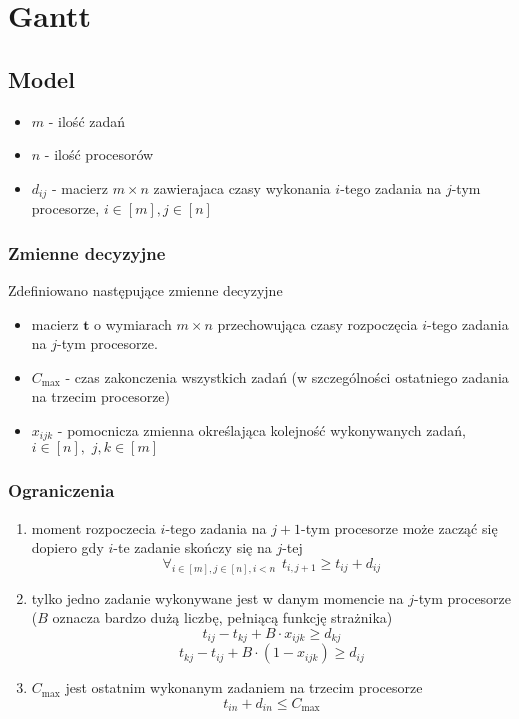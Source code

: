 \section{Gantt}

\subsection{Model}
\begin{itemize}
    \item $m$ - ilość zadań
    \item $n$ - ilość procesorów
    \item $d_{ij}$ - macierz $m\times n$ zawierajaca czasy wykonania $i$-tego zadania na $j$-tym procesorze, $i\in[m], j\in[n]$
\end{itemize}

\subsubsection{Zmienne decyzyjne}
Zdefiniowano następujące zmienne decyzyjne
\begin{itemize}
    \item macierz $\mathbf{t}$ o wymiarach $m \times n$ przechowująca czasy rozpoczęcia $i$-tego zadania na $j$-tym procesorze.
    \item $C_{\text{max}}$ - czas zakonczenia wszystkich zadań (w szczególności ostatniego zadania na trzecim procesorze)
    \item $x_{ijk}$ - pomocnicza zmienna określająca kolejność wykonywanych zadań, $i\in[n],\hspace{4pt}j,k\in[m]$
\end{itemize}

\subsubsection{Ograniczenia}
\begin{enumerate}
    \item moment rozpoczecia $i$-tego zadania na $j+1$-tym procesorze może zacząć się dopiero gdy $i$-te zadanie skończy się na $j$-tej
    $$ \forall_{i\in[m], j\in[n], i < n} \hspace{5pt} t_{i, j+1} \geq t_{ij} + d_{ij} $$
    \item tylko jedno zadanie wykonywane jest w danym momencie na $j$-tym procesorze ($B$ oznacza bardzo dużą liczbę, pełniącą funkcję strażnika)
    $$ t_{ij} - t_{kj} + B \cdot x_{ijk} \geq d_{kj} $$
    $$ t_{kj} - t_{ij} + B \cdot (1 - x_{ijk}) \geq d_{ij} $$
    \item $C_{\text{max}}$ jest ostatnim wykonanym zadaniem na trzecim procesorze
    $$ t_{in} + d_{in} \leq C_{\text{max}} $$
\end{enumerate}

